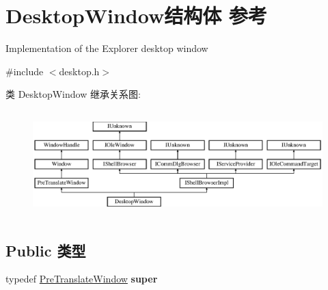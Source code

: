 \hypertarget{struct_desktop_window}{}\section{Desktop\+Window结构体 参考}
\label{struct_desktop_window}


Implementation of the Explorer desktop window  




{\ttfamily \#include $<$desktop.\+h$>$}

类 Desktop\+Window 继承关系图\+:\begin{figure}[H]
\begin{center}
\leavevmode
\includegraphics[height=4.117647cm]{struct_desktop_window}
\end{center}
\end{figure}
\subsection*{Public 类型}
\begin{DoxyCompactItemize}
\item 
\mbox{\label{struct_desktop_window_ac676fbce179055684438865e9caeb1fe}} 
typedef \hyperlink{struct_pre_translate_window}{Pre\+Translate\+Window} {\bfseries super}
\end{DoxyCompactItemize}
